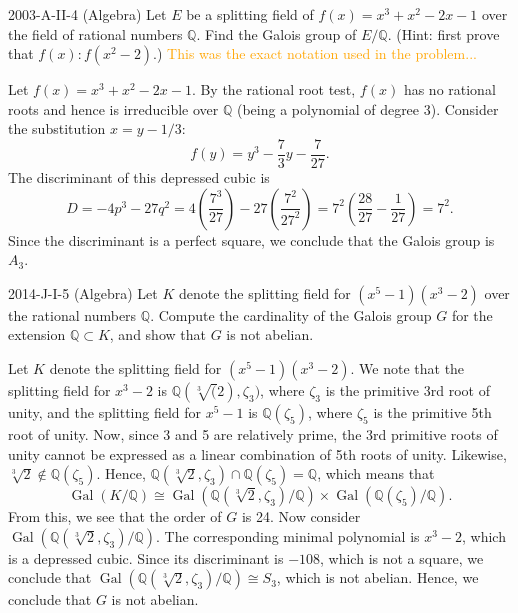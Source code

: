 \documentclass{article}
\begin{document}
\begin{prb}{2003-A-II-4 (Algebra)}
	Let $E$ be a splitting field of $f(x) = x^{3} + x^{2} - 2x - 1$ over the field of rational numbers $\mathbb{Q}$. Find the Galois group of $E/\mathbb{Q}$. (Hint: first prove that $f(x):f(x^{2} - 2)$.) \textcolor{orange}{This was the exact notation used in the problem...} 
\end{prb}
\begin{solutions}
	Let $f(x) = x^{3} + x^{2} - 2x - 1$. By the rational root test, $f(x)$ has no rational roots and hence is irreducible over $\mathbb{Q}$ (being a polynomial of degree 3). Consider the substitution $x = y - 1/3$: 
		\begin{equation}
			f(y) = y^{3} - \frac{7}{3}y - \frac{7}{27}. 
		\end{equation}
	The discriminant of this depressed cubic is 
		\begin{equation}
			D = -4p^{3} - 27q^{2} =4\left(\frac{7^{3}}{27}\right) - 27\left(\frac{7^{2}}{27^{2}}\right) = 7^{2}\left(\frac{28}{27} -\frac{1}{27}\right) = 7^{2}. 
		\end{equation}
	Since the discriminant is a perfect square, we conclude that the Galois group is $A_{3}$. 
\end{solutions}
\begin{prb}{2014-J-I-5 (Algebra)}
	Let $K$ denote the splitting field for $(x^{5} - 1)(x^{3} - 2)$ over the rational numbers $\mathbb{Q}$. Compute the cardinality of the Galois group $G$ for the extension $\mathbb{Q} \subset K$, and show that $G$ is not abelian. 
\end{prb}
\begin{solutions}
	Let $K$ denote the splitting field for $(x^{5} - 1)(x^{3} - 2)$. We note that the splitting field for $x^{3} - 2$ is $\mathbb{Q}(\sqrt[3](2), \zeta_{3})$, where $\zeta_{3}$ is the primitive 3rd root of unity, and the splitting field for $x^{5} - 1$ is $\mathbb{Q}(\zeta_{5})$, where $\zeta_{5}$ is the primitive 5th root of unity. Now, since 3 and 5 are relatively prime, the 3rd primitive roots of unity cannot be expressed as a linear combination of 5th roots of unity. Likewise, $\sqrt[3]{2} \notin \mathbb{Q}(\zeta_{5})$. Hence, $\mathbb{Q}(\sqrt[3]{2}, \zeta_{3}) \cap \mathbb{Q}(\zeta_{5}) = \mathbb{Q}$, which means that 
		\begin{equation}
			\operatorname{Gal}(K/\mathbb{Q}) \cong \operatorname{Gal}(\mathbb{Q}(\sqrt[3]{2},\zeta_{3})/\mathbb{Q}) \times \operatorname{Gal}(\mathbb{Q}(\zeta_{5})/\mathbb{Q}). 
		\end{equation}
	From this, we see that the order of $G$ is 24. Now consider $\operatorname{Gal}(\mathbb{Q}(\sqrt[3]{2},\zeta_{3})/\mathbb{Q})$. The corresponding minimal polynomial is $x^{3} - 2$, which is a depressed cubic. Since its discriminant is $-108$, which is not a square, we conclude that $\operatorname{Gal}(\mathbb{Q}(\sqrt[3]{2}, \zeta_{3})/\mathbb{Q}) \cong S_{3}$, which is not abelian. Hence, we conclude that $G$ is not abelian.  
\end{solutions}
\end{document}
